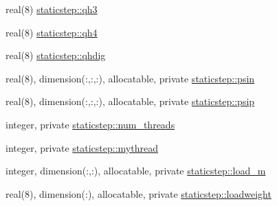 \begin{DoxyCompactItemize}
\item 
real(8) \hyperlink{namespacestaticstep_ade5f5f5eb8e4fe1c8c95cbbfe3eab7fb}{staticstep\+::qh3}
\item 
real(8) \hyperlink{namespacestaticstep_a565f7e97adec7cf001d80bcbeb5294b9}{staticstep\+::qh4}
\item 
real(8) \hyperlink{namespacestaticstep_a03eb2b19fb183c4ec6075241077232ca}{staticstep\+::qhdig}
\item 
real(8), dimension(\+:,\+:,\+:), allocatable, private \hyperlink{namespacestaticstep_afd576c66455f9e0537bf703b10a6a9eb}{staticstep\+::psin}
\item 
real(8), dimension(\+:,\+:,\+:), allocatable, private \hyperlink{namespacestaticstep_af4d990f6823f777da64820a0c2b57616}{staticstep\+::psip}
\item 
integer, private \hyperlink{namespacestaticstep_a3a3097b03f69cc230a1cb4f99edfd657}{staticstep\+::num\+\_\+threads}
\item 
integer, private \hyperlink{namespacestaticstep_a97ea4745bce5d66d8e1d52b1faab0961}{staticstep\+::mythread}
\item 
integer, dimension(\+:,\+:), allocatable, private \hyperlink{namespacestaticstep_a87b0a1d8427decf30e957bb3f16b0d37}{staticstep\+::load\+\_\+m}
\item 
real(8), dimension(\+:), allocatable, private \hyperlink{namespacestaticstep_a1986460549ea65bc38b06fa1dcca5c80}{staticstep\+::loadweight}
\end{DoxyCompactItemize}
